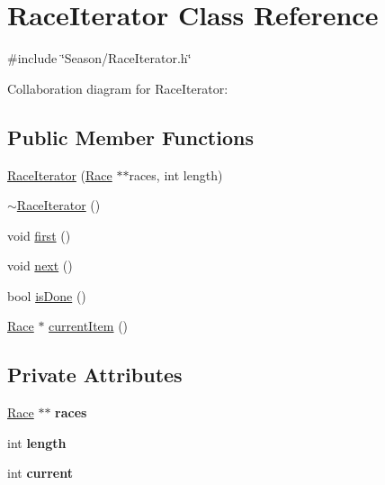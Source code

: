 \hypertarget{classRaceIterator}{}\section{Race\+Iterator Class Reference}
\label{classRaceIterator}


{\ttfamily \#include \char`\"{}Season/\+Race\+Iterator.\+h\char`\"{}}



Collaboration diagram for Race\+Iterator\+:
\subsection*{Public Member Functions}
\begin{DoxyCompactItemize}
\item 
\hyperlink{classRaceIterator_a9610179f3d991dc1611574451d7306ea}{Race\+Iterator} (\hyperlink{classRace}{Race} $\ast$$\ast$races, int length)
\item 
\hyperlink{classRaceIterator_a38882308a5d81320ee9c04f783076555}{$\sim$\+Race\+Iterator} ()
\item 
void \hyperlink{classRaceIterator_abfb9e2f16da89b19285414181d6bc7c0}{first} ()
\item 
void \hyperlink{classRaceIterator_ae2a022fadedd9f0c51f9b3f8f994985f}{next} ()
\item 
bool \hyperlink{classRaceIterator_a406ce41eae09904a94502f80344f537d}{is\+Done} ()
\item 
\hyperlink{classRace}{Race} $\ast$ \hyperlink{classRaceIterator_adceb8655316b9b0ca00dbe4494ece887}{current\+Item} ()
\end{DoxyCompactItemize}
\subsection*{Private Attributes}
\begin{DoxyCompactItemize}
\item 
\mbox{\label{classRaceIterator_adf792f29e2d02d2278bc512f1f28a60c}} 
\hyperlink{classRace}{Race} $\ast$$\ast$ {\bfseries races}
\item 
\mbox{\label{classRaceIterator_afed19ccd046f532c72861bc8f5b7b23d}} 
int {\bfseries length}
\item 
\mbox{\label{classRaceIterator_a8830cf0c06ea4f0ced93860766841dda}} 
int {\bfseries current}
\end{DoxyCompactItemize}


